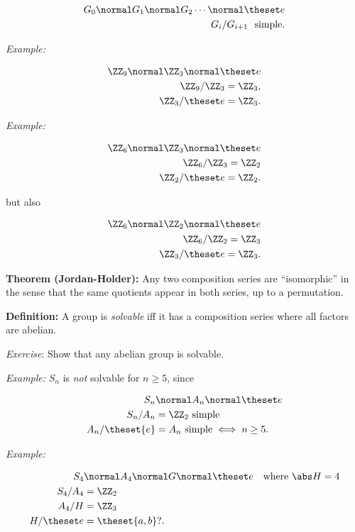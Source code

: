 \begin{align*}
G_0 \normal G_1 \normal G_2 \cdots \normal \theset e \\
G_i/G_{i+1}~\text{ simple}
.\end{align*}

\emph{Example:}

\begin{align*}
\ZZ_9 \normal \ZZ_3 \normal \theset e \\
\ZZ_9 / \ZZ_3 = \ZZ_3,\\
\ZZ_3 / \theset e = \ZZ_3
.\end{align*}

\emph{Example:}

\begin{align*}
\ZZ_6 \normal \ZZ_3 \normal \theset e \\
\ZZ_6 / \ZZ_3 = \ZZ_2 \\
\ZZ_2 / \theset e = \ZZ_2
.\end{align*}

but also

\begin{align*}
\ZZ_6 \normal \ZZ_2 \normal \theset e \\
\ZZ_6 / \ZZ_2 = \ZZ_3 \\
\ZZ_3 / \theset e = \ZZ_3
.\end{align*}

\textbf{Theorem (Jordan-Holder):} Any two composition series are
``isomorphic'' in the sense that the same quotients appear in both
series, up to a permutation.

\textbf{Definition:} A group is \emph{solvable} iff it has a composition
series where all factors are abelian.

\emph{Exercise}: Show that any abelian group is solvable.

\emph{Example:} \(S_n\) is \emph{not} solvable for \(n\geq 5\), since

\begin{align*}
S_n &\normal A_n \normal \theset e \\
S_n / A_n &= \ZZ_2~\text{simple} \\
A_n / \theset{e} &= A_n~\text{simple} \iff n\geq 5
.\end{align*}

\emph{Example:}

\begin{align*}
S_4 &\normal A_4 \normal G \normal \theset e \quad \text{where } \abs H = 4 \\
S_4 / A_4 &= \ZZ_2 \\
A_4 / H &= \ZZ_3 \\
H / \theset e &= \theset{a, b}?
.\end{align*}

